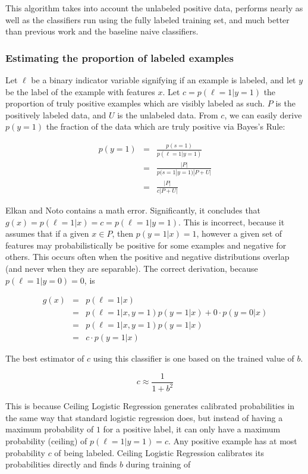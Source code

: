 \documentclass{article}
\begin{document}
This algorithm takes into account the unlabeled positive data, performs nearly as well as the classifiers run using the fully labeled training set, and much better than previous work and the baseline naive classifiers.

\subsubsection{Estimating the proportion of labeled examples}

Let $\ell$ be a binary indicator variable signifying if an example is labeled, and let $y$ be the label of the example with features $x$. Let $c = p(\ell=1|y=1)$ the proportion of truly positive examples which are visibly labeled as such. $P$ is the positively labeled data, and $U$ is the unlabeled data. From $c$, we can easily derive $p(y=1)$ the fraction of the data which are truly positive via Bayes's Rule:

\begin{eqnarray*}
p(y=1) &=& \frac{p(s=1)}{p(\ell = 1|y = 1)} \\
 &=&  \frac{|P|}{p(s = 1|y = 1)|P+U|} \\
 &=& \frac{|P|}{c|P+U|}
\end{eqnarray*}

Elkan and Noto  contains a math error.  Significantly, it concludes that $g(x) = p(\ell=1|x) = c = p(\ell=1|y=1)$. This is incorrect, because it assumes that if a given $x \in P$, then $p(y=1|x) = 1$, however a given set of features may probabilistically be positive for some examples and negative for others. This occurs often when the positive and negative distributions overlap (and never when they are separable). The correct derivation, because $p(\ell=1|y=0)=0$, is

\begin{eqnarray*}
g(x) &=& p(\ell=1|x) \\
 &=& p(\ell=1|x,y=1)p(y=1|x) + 0 \cdot p(y=0|x) \\
 &=& p(\ell=1|x,y=1)p(y=1|x) \\
 &=& c \cdot p(y=1|x)
\end{eqnarray*}

The best estimator of $c$ using this classifier is one based on the trained value of $b$.

$$c \approx \frac{1}{1 + b^2}$$

This is because Ceiling Logistic Regression generates calibrated probabilities in the same way that standard logistic regression does, but instead of having a maximum probability of $1$ for a positive label, it can only have a maximum probability (ceiling) of $p(\ell=1|y=1)=c$. Any positive example has at most probability $c$ of being labeled.  Ceiling Logistic Regression calibrates its probabilities directly and finds $b$ during training of
\end{document}
